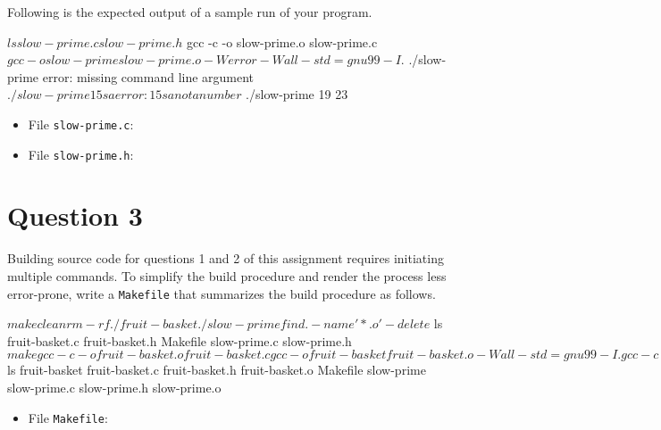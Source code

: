 \documentclass[12pt,letterpaper,twoside]{article}
\begin{document}
\lstset{language=c,tabsize=4}


\newpage

Following is the expected output of a sample run of your program.

\begin{terminal}
$ ls
slow-prime.c slow-prime.h
$ gcc -c -o slow-prime.o slow-prime.c
$ gcc -o slow-prime slow-prime.o -Werror -Wall -std=gnu99 -I.
$ ./slow-prime
error: missing command line argument
$ ./slow-prime 15sa
error: 15sa not a number
$ ./slow-prime 19
23
\end{terminal}

\lstset{language=c,tabsize=4}
\begin{itemize}
\item[] File \texttt{slow-prime.c}:

\newpage
\item[] File \texttt{slow-prime.h}:

\end{itemize}

\section*{Question 3}

Building source code for questions 1 and 2 of this assignment requires initiating multiple commands.
To simplify the build procedure and render the process less error-prone, write a \texttt{Makefile} that summarizes the build procedure as follows.

\begin{terminal}
$ make clean
rm -rf ./fruit-basket ./slow-prime
find . -name '*.o' -delete
$ ls
fruit-basket.c fruit-basket.h Makefile slow-prime.c
slow-prime.h
$ make
gcc -c -o fruit-basket.o fruit-basket.c
gcc -o fruit-basket fruit-basket.o -Wall -std=gnu99 -I.
gcc -c -o slow-prime.o slow-prime.c
gcc -o slow-prime slow-prime.o -Werror -Wall -std=gnu99 -I.
$ ls
fruit-basket fruit-basket.c fruit-basket.h fruit-basket.o
Makefile     slow-prime     slow-prime.c   slow-prime.h
slow-prime.o
\end{terminal}

\newpage

\lstset{language=[gnu]make,tabsize=4}
\begin{itemize}
\item[] File \texttt{Makefile}:

\end{itemize}

\end{document}
